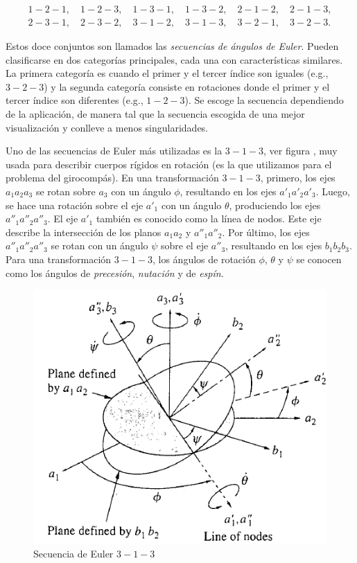 \documentclass[a4paper,10pt]{article}
\numberwithin{equation}{section}
\begin{document}
\begin{align*}
 1-2-1,\quad 1-2-3,\quad 1-3-1,\quad 1-3-2,\quad 2-1-2,\quad 2-1-3, \\
 2-3-1,\quad 2-3-2,\quad 3-1-2,\quad 3-1-3,\quad 3-2-1,\quad 3-2-3.
\end{align*}

Estos doce conjuntos son llamados las \emph{secuencias de ángulos de Euler}. Pueden 
clasificarse en dos categorías principales, cada una con características similares. 
La primera categoría es cuando el primer y el tercer índice son iguales (e.g., $3-2-3$) 
y la segunda categoría consiste en rotaciones donde el primer y el tercer índice 
son diferentes (e.g., $1-2-3$). Se escoge la secuencia dependiendo de la aplicación, 
de manera tal que la secuencia escogida de una mejor visualización y conlleve a 
menos singularidades.
 
\vspace{.3cm}

Uno de las secuencias de Euler más utilizadas es la $3-1-3$, ver figura , muy usada para describir 
cuerpos rígidos en rotación (es la que utilizamos para el problema del girocompás). En 
una transformación $3-1-3$, primero, los ejes $a_1a_2a_3$ se rotan sobre $a_3$ 
con un ángulo $\phi$, resultando en los ejes $a'_1a'_2a'_3$. Luego, se hace una rotación 
sobre el eje $a'_1$ con un ángulo $\theta$, produciendo los ejes $a''_1a''_2a''_3$. 
El eje $a'_1$ también es conocido como la línea de nodos. Este eje describe la 
intersección de los planos $a_1a_2$ y $a''_1a''_2$. Por último, los ejes $a''_1a''_2a''_3$ 
se rotan con un ángulo $\psi$ sobre el eje $a''_3$, resultando en los ejes $b_1b_2b_3$.
Para una transformación $3-1-3$, los ángulos de rotación $\phi$, $\theta$ y $\psi$ se 
conocen como los ángulos de \emph{precesión}, \emph{nutación} y de \emph{espín}.


\begin{figure}[H]
\center 
\includegraphics[scale=0.38]{apendice2fig1}
\caption{Secuencia de Euler $3-1-3$}
\label{fig:apendice2fig1}
\end{figure}
\end{document}
